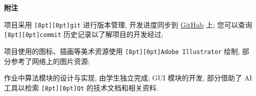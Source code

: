 \documentclass{ctexart}
\newcommand{\subtitletext}[1]{{\fontsize{16}{16} \textbf{#1} \vspace*{1ex}}}
\newcommand{\codebox}[1]{\colorbox[rgb]{0.9, 0.9, 0.9}{\texttt{\raisebox{0pt}[8pt][0pt]{#1}}}}
\begin{document}
\subtitletext{附注}

项目采用 \codebox{git} 进行版本管理, 开发进度同步到 \href{https://github.com/lastrivia/Coursework_Calc24}{GitHub} 上;
您可以查询 \codebox{commit} 历史记录以了解项目的开发经过; 

项目使用的图标、插画等美术资源使用 \codebox{Adobe Illustrator} 绘制, 部分参考了网络上的图片资源;

作业中算法模块的设计与实现, 由学生独立完成; GUI 模块的开发, 部分借助了 AI 工具以检索 \codebox{Qt} 的技术文档和相关资料.
\end{document}
